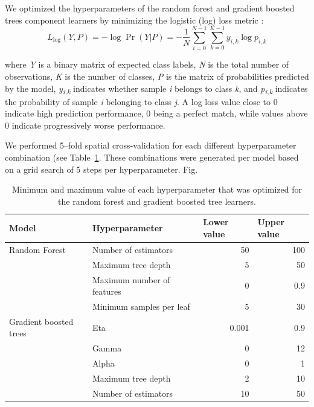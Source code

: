     We optimized the hyperparameters of the random forest and gradient boosted trees component learners by minimizing the logistic (log) loss metric  \citep{lovelace2019geocomputation}:
    \begin{equation}
        L_{\log}(Y, P) = -\log \operatorname{Pr}(Y|P) = - \frac{1}{N} \sum_{i=0}^{N-1} \sum_{k=0}^{K-1} y_{i,k} \log p_{i,k}
    \end{equation}
    
    \noindent where \emph{Y} is a binary matrix of expected class labels, \emph{N} is the total number of observations, \emph{K} is the number of classes, \emph{P} is the matrix of probabilities predicted by the model, \emph{y\textsubscript{i,k}} indicates whether sample \emph{i} belongs to class \emph{k}, and \emph{p\textsubscript{i,k}} indicates the probability of sample \emph{i} belonging to class \emph{j}. A log loss value close to 0 indicate high prediction performance, 0 being a perfect match, while values above 0 indicate progressively worse performance.
    
    We performed 5--fold spatial cross-validation for each different hyperparameter combination (see Table\@~\ref{tab:hyperparameters}. These combinations were generated per model based on a grid search of 5 steps per hyperparameter. Fig.
        
    \begin{table}[!hbt]
    \centering
    \caption{Minimum and maximum value of each hyperparameter that was optimized for the random forest and gradient boosted tree learners.}
    \label{tab:hyperparameters}
    \begin{tabular}{@{}llrr@{}}
    \toprule
    Model & Hyperparameter & \multicolumn{1}{l}{Lower value} & \multicolumn{1}{l}{Upper value} \\ 
    \midrule
    Random Forest & Number of estimators & 50 & 100 \\
     & Maximum tree depth & 5 & 50 \\
     & Maximum number of features & 0 & 0.9 \\
     & Minimum samples per leaf & 5 & 30 \\
    Gradient boosted trees & Eta & 0.001 & 0.9 \\
     & Gamma & 0 & 12 \\
     & Alpha & 0 & 1 \\
     & Maximum tree depth & 2 & 10 \\
     & Number of estimators & 10 & 50 \\ 
     \bottomrule
    \end{tabular}
    \end{table}
    
